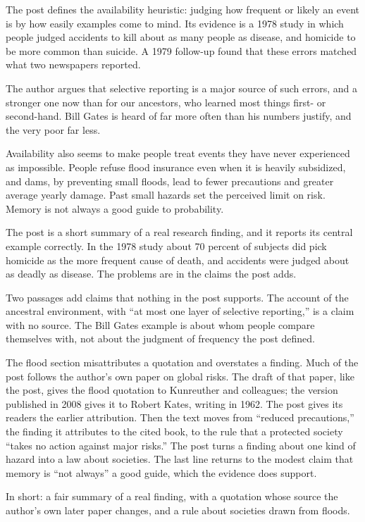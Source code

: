 \begin{afterword}
\summaryhead

The post defines the availability heuristic: judging how frequent or likely an event is by how easily examples come to mind. Its evidence is a 1978 study in which people judged accidents to kill about as many people as disease, and homicide to be more common than suicide. A 1979 follow-up found that these errors matched what two newspapers reported.

The author argues that selective reporting is a major source of such errors, and a stronger one now than for our ancestors, who learned most things first- or second-hand. Bill Gates is heard of far more often than his numbers justify, and the very poor far less.

Availability also seems to make people treat events they have never experienced as impossible. People refuse flood insurance even when it is heavily subsidized, and dams, by preventing small floods, lead to fewer precautions and greater average yearly damage. Past small hazards set the perceived limit on risk. Memory is not always a good guide to probability.

\responsehead

The post is a short summary of a real research finding, and it reports its central example correctly. In the 1978 study about 70 percent of subjects did pick homicide as the more frequent cause of death, and accidents were judged about as deadly as disease. The problems are in the claims the post adds.

Two passages add claims that nothing in the post supports. The account of the ancestral environment, with ``at most one layer of selective reporting,'' is a claim with no source. The Bill Gates example is about whom people compare themselves with, not about the judgment of frequency the post defined.

The flood section misattributes a quotation and overstates a finding. Much of the post follows the author's own paper on global risks. The draft of that paper, like the post, gives the flood quotation to Kunreuther and colleagues; the version published in 2008 gives it to Robert Kates, writing in 1962. The post gives its readers the earlier attribution. Then the text moves from ``reduced precautions,'' the finding it attributes to the cited book, to the rule that a protected society ``takes no action against major risks.'' The post turns a finding about one kind of hazard into a law about societies. The last line returns to the modest claim that memory is ``not always'' a good guide, which the evidence does support.

In short: a fair summary of a real finding, with a quotation whose source the author's own later paper changes, and a rule about societies drawn from floods.
\end{afterword}
